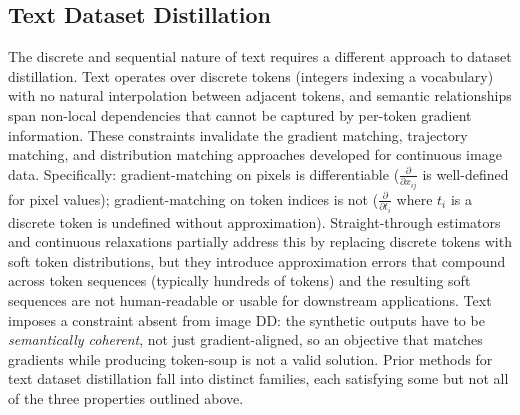 \subsection{Text Dataset Distillation} \label{sec:26-background-datasetdistill-textdd}
\begin{foldable}
  The discrete and sequential nature of text requires a different approach to dataset distillation.
  Text operates over discrete tokens (integers indexing a vocabulary) with no natural interpolation between adjacent tokens, and semantic relationships span non-local dependencies that cannot be captured by per-token gradient information.
  These constraints invalidate the gradient matching, trajectory matching, and distribution matching approaches developed for continuous image data.
  Specifically: gradient-matching on pixels is differentiable ($\frac{\partial}{\partial x_{ij}}$ is well-defined for pixel values); gradient-matching on token indices is not ($\frac{\partial}{\partial t_i}$ where $t_i$ is a discrete token is undefined without approximation).
  Straight-through estimators and continuous relaxations partially address this by replacing discrete tokens with soft token distributions, but they introduce approximation errors that compound across token sequences (typically hundreds of tokens) and the resulting soft sequences are not human-readable or usable for downstream applications.
  Text imposes a constraint absent from image \ac{DD}: the synthetic outputs have to be \textit{semantically coherent}, not just gradient-aligned, so an objective that matches gradients while producing token-soup is not a valid solution.
  Prior methods for text dataset distillation fall into distinct families, each satisfying some but not all of the three properties outlined above.
\end{foldable}

